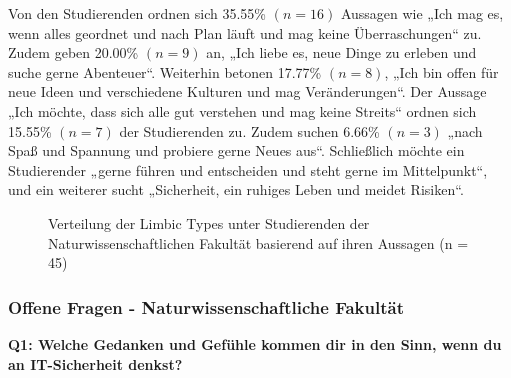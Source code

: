 \documentclass[german,report]{i1thesis}
\begin{document}
Von den Studierenden ordnen sich 35.55\% \((n = 16)\) Aussagen wie „Ich mag es, wenn alles geordnet und nach Plan läuft und mag keine Überraschungen“ zu. Zudem geben 20.00\% \((n = 9)\) an, „Ich liebe es, neue Dinge zu erleben und suche gerne Abenteuer“. Weiterhin betonen 17.77\% \((n = 8)\), „Ich bin offen für neue Ideen und verschiedene Kulturen und mag Veränderungen“. Der Aussage „Ich möchte, dass sich alle gut verstehen und mag keine Streits“ ordnen sich 15.55\% \((n = 7)\) der Studierenden zu. Zudem suchen 6.66\% \((n = 3)\) „nach Spaß und Spannung und probiere gerne Neues aus“. Schließlich möchte ein Studierender „gerne führen und entscheiden und steht gerne im Mittelpunkt“, und ein weiterer sucht „Sicherheit, ein ruhiges Leben und meidet Risiken“.

\begin{figure}[H]
\centering
{}
\caption{Verteilung der Limbic Types \cite{hausel2011wissenschaftliche} unter Studierenden der Naturwissenschaftlichen Fakultät basierend auf ihren Aussagen (n = 45)}
\label{fig:limbic_types}
\end{figure}

\subsubsection{Offene Fragen - Naturwissenschaftliche Fakultät}

\textbf{Q1: Welche Gedanken und Gefühle kommen dir in den Sinn, wenn du an IT-Sicherheit denkst?}
\end{document}
